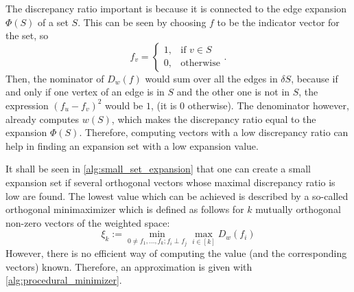 The discrepancy ratio important is because it is connected to the edge expansion $\Phi(S)$ of a set $S$. This can be seen by choosing $f$ to be the indicator vector for the set, so \begin{equation}
	f_v=\begin{cases}
	1, & \text{if } v\in S\\
	0, & \text{otherwise}
	\end{cases}.
\end{equation} Then, the nominator of $D_w(f)$ would sum over all the edges in $\delta S$, because if and only if one vertex of an edge is in $S$ and the other one is not in $S$, the expression $(f_u - f_v)^2 $ would be $1$, (it is $0$ otherwise). The denominator however, already computes $w(S)$, which makes the discrepancy ratio equal to the expansion $\Phi(S)$. Therefore, computing vectors with a low discrepancy ratio can help in finding an expansion set with a low expansion value.


It shall be seen in \cref{alg:small_set_expansion} that one can create a small expansion set if several orthogonal vectors whose maximal discrepancy ratio is low are found. The lowest value which can be achieved is described by a so-called orthogonal minimaximizer which is defined as follows for $k$ mutually orthogonal non-zero vectors of the weighted space:
\begin{equation}\label{eq:xi}
\xi_k := \min_{0 \neq f_1, \ldots , f_k ; f_i \perp f_j } \max_{i \in [k]} D_w(f_i)
\end{equation}
However, there is no efficient way of computing the value (and the corresponding vectors) known. Therefore, an approximation is given with \cref{alg:procedural_minimizer}.






